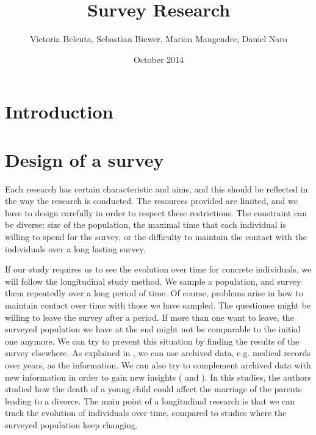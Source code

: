 \documentclass{report}
\title{Survey Research}
\author{Victoria Beleuta, Sebastian Biewer, Marion Maugendre, Daniel Naro}
\date{October 2014}
\begin{document}
\maketitle
\tableofcontents

\chapter{Introduction}
\chapter{Design of a survey}
Each research has certain characteristic and aims, and this should be reflected in the way the research is conducted. The resources provided are limited, and we have to design carefully in order to respect these restrictions. The constraint can be diverse: size of the population, the maximal time that each individual is willing to spend for the survey, or the difficulty to maintain the contact with the individuals over a long lasting survey.

If our study requires us to see the evolution over time for concrete individuals, we will follow the longitudinal study method. We sample a population, and survey them repeatedly over a long period of time. Of course, problems arise in how to maintain contact over time with those we have sampled. The questionee might be willing to leave the survey after a period. If more than one want to leave, the surveyed population we have at the end might not be comparable to the initial one anymore.
We can try to prevent this situation by finding the results of the survey elsewhere. As explained in \cite{JohnShaughnessyEugeneZechmeister2011}, we can use archived data, e.g. medical records over years, as the information. We can also try to complement archived data with new information in order to gain new insights (\cite{Friedman} and \cite{Tucker}). In this studies, the authors studied how the death of a young child could affect the marriage of the parents leading to a divorce.
The main point of a longitudinal research is that we can track the evolution of individuals over time, compared to studies where the surveyed population keep changing.
\end{document}
